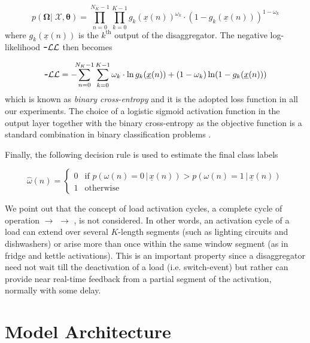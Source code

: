 \documentclass[twocolumn,letter,10pt]{IEEEtran} %
\begin{document}
{\small\begin{equation*}
	p\left(\bm{\Omega} |\; \bm{\mathcal{X}}, \bm{\theta} \right) = \prod_{n=0}^{N_K-1} \prod_{k=0}^{K-1} g_k(\underline{x}(n))^{\omega_k} \cdot (1 - g_k(\underline{x}(n)))^{1-\omega_k}
	\end{equation*}}%
where $g_k(\underline{x}(n))$ is the $k^\text{th}$ output of the disaggregator. The negative log-likelihood $\texttt{\textbf{-}}\mathcal{LL}$ then becomes

{\small\begin{equation*}
	\small
	\texttt{\textbf{-}}\mathcal{LL} = -\kern-0.5em\sum_{n=0}^{N_K-1} \sum_{k=0}^{K-1} \omega_k\cdot\ln g_k(\underline{x}(n)) + (1-\omega_k) \ln (1 - g_k(\underline{x}(n)))
	\end{equation*}}%
which is known as \emph{binary cross-entropy} and it is the adopted loss function in all our experiments. The choice of a logistic sigmoid activation function in the output layer together with the binary cross-entropy as the objective function is a standard combination in binary classification problems \cite{Bishop_2006}.

Finally, the following decision rule is used to estimate the final class labels

{\small\begin{equation*}
	\hat{\omega}(n)=
	\begin{cases}
	0 & \text{if } p(\omega(n) = 0\,|\,\underline{x}(n)) > p(\omega(n) = 1\,|\,\underline{x}(n)) \\[1mm]
	1 & \text{otherwise}
	\end{cases}
	\end{equation*}}%

We point out that the concept of load activation cycles, a complete cycle of operation \off $\rightarrow$ \on $\rightarrow$ \off, is not considered. In other words, an activation cycle of a load can extend over several $K$-length segments (such as lighting circuits and dishwashers) or arise more than once within the same window segment (as in fridge and kettle activations). This is an important property since a disaggregator need not wait till the deactivation of a load (i.e. switch-\off event) but rather can provide {near} real-time feedback from a partial segment of the activation, normally with some delay.

\section{Model Architecture}
\label{sec:model-selection}
\end{document}
